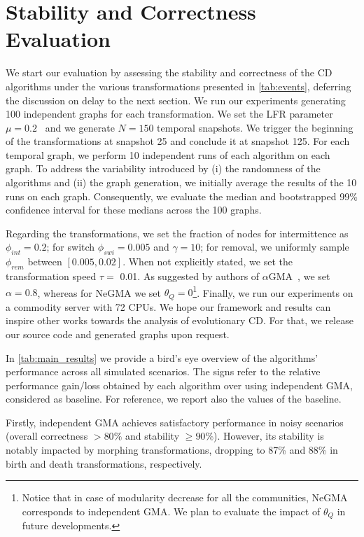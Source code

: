 \documentclass[letterpaper]{article}
\begin{document}
\section{Stability and Correctness Evaluation}
\label{s:experiments}

We start our evaluation by assessing the stability and correctness of the CD algorithms under the various transformations presented in \cref{tab:events}, deferring the discussion on delay to the next section.
We run our experiments generating 100 independent graphs for each transformation. We set the LFR parameter $\mu=0.2$~\cite{lancichinetti2008benchmark} and we generate $N=150$ temporal snapshots. We trigger the beginning of the transformations at snapshot 25 and conclude it at snapshot 125. For each temporal graph, we perform 10 independent runs of each algorithm on each graph.
To address the variability introduced by (i) the randomness of the algorithms and (ii) the graph generation, we initially average the results of the 10 runs on each graph. Consequently, we evaluate the median and bootstrapped 99\% confidence interval for these medians across the 100 graphs.

Regarding the transformations, we set the fraction of nodes for intermittence as $\phi_{int}=0.2$; for switch $\phi_{swi}=0.005$ and $\gamma=10$; for removal, we uniformly sample $\phi_{rem}$ between $[0.005, 0.02]$. When not explicitly stated, we set the transformation speed $\tau =$ 0.01.
As suggested by authors of $\alpha$GMA~\cite{elegazzar2021alpha}, we set $\alpha=0.8$, whereas for NeGMA we set $\theta_Q = 0$\footnote{Notice that in case of modularity decrease for all the communities, NeGMA corresponds to independent GMA. We plan to evaluate the impact of $\theta_Q$ in future developments.}.
Finally, we run our experiments on a commodity server with 72 CPUs. We hope our framework and results can inspire other works towards the analysis of evolutionary CD. For that, we release our source code and generated graphs upon request.

In \cref{tab:main_results} we provide a bird's eye overview of the algorithms' performance across all simulated scenarios. The signs refer to the relative performance gain/loss obtained by each algorithm over using independent GMA, considered as baseline. For reference, we report also the values of the baseline.

Firstly, independent GMA achieves satisfactory performance in noisy scenarios (overall correctness $>80\%$ and stability $\geq90\%$). However, its stability is notably impacted by morphing transformations, dropping to  87\% and 88\% in birth and death transformations, respectively.
\end{document}
